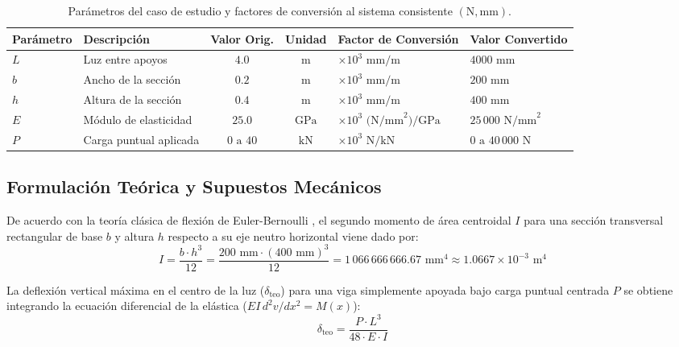 \documentclass[11pt,a4paper]{article}
\begin{document}
\begin{table}[H]
\centering
\caption{Parámetros del caso de estudio y factores de conversión al sistema consistente $(\text{N}, \text{mm})$.}
\label{tab:parametros}
\begin{tabular}{@{}llccll@{}}
\toprule
\textbf{Parámetro} & \textbf{Descripción} & \textbf{Valor Orig.} & \textbf{Unidad} & \textbf{Factor de Conversión} & \textbf{Valor Convertido} \\ \midrule
$L$ & Luz entre apoyos & $4.0$ & $\text{m}$ & $\times 10^{3}\text{ mm/m}$ & $4000\text{ mm}$ \\
$b$ & Ancho de la sección & $0.2$ & $\text{m}$ & $\times 10^{3}\text{ mm/m}$ & $200\text{ mm}$ \\
$h$ & Altura de la sección & $0.4$ & $\text{m}$ & $\times 10^{3}\text{ mm/m}$ & $400\text{ mm}$ \\
$E$ & Módulo de elasticidad & $25.0$ & $\text{GPa}$ & $\times 10^{3}\text{ (N/mm}^2\text{)/GPa}$ & $25\,000\text{ N/mm}^2$ \\
$P$ & Carga puntual aplicada & $0 \text{ a } 40$ & $\text{kN}$ & $\times 10^{3}\text{ N/kN}$ & $0 \text{ a } 40\,000\text{ N}$ \\ \bottomrule
\end{tabular}
\end{table}

\subsection{Formulación Teórica y Supuestos Mecánicos}
De acuerdo con la teoría clásica de flexión de Euler-Bernoulli \cite{hibbeler2017mecanica, gere2013mecanica}, el segundo momento de área centroidal $I$ para una sección transversal rectangular de base $b$ y altura $h$ respecto a su eje neutro horizontal viene dado por:
\begin{equation}
    I = \frac{b \cdot h^3}{12} = \frac{200\text{ mm} \cdot (400\text{ mm})^3}{12} = 1\,066\,666\,666.67\text{ mm}^4 \approx 1.0667 \times 10^{-3}\text{ m}^4
    \label{eq:inercia}
\end{equation}

La deflexión vertical máxima en el centro de la luz ($\delta_{\text{teo}}$) para una viga simplemente apoyada bajo carga puntual centrada $P$ se obtiene integrando la ecuación diferencial de la elástica ($E I \, d^2v/dx^2 = M(x)$):
\begin{equation}
    \delta_{\text{teo}} = \frac{P \cdot L^3}{48 \cdot E \cdot I}
    \label{eq:deflexion}
\end{equation}
\end{document}

